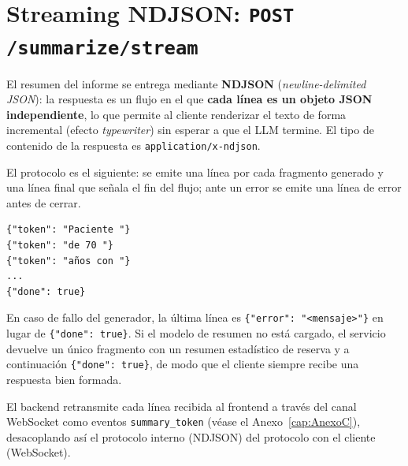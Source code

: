 \section{Streaming NDJSON: \texttt{POST /summarize/stream}}

El resumen del informe se entrega mediante \textbf{NDJSON} (\emph{newline-delimited JSON}): la respuesta es un flujo en el que \textbf{cada línea es un objeto JSON independiente}, lo que permite al cliente renderizar el texto de forma incremental (efecto \emph{typewriter}) sin esperar a que el LLM termine. El tipo de contenido de la respuesta es \texttt{application/x-ndjson}.

El protocolo es el siguiente: se emite una línea por cada fragmento generado y una línea final que señala el fin del flujo; ante un error se emite una línea de error antes de cerrar.

{\small
\begin{verbatim}
{"token": "Paciente "}
{"token": "de 70 "}
{"token": "años con "}
...
{"done": true}
\end{verbatim}
}

En caso de fallo del generador, la última línea es \texttt{\{"error": "<mensaje>"\}} en lugar de \texttt{\{"done": true\}}. Si el modelo de resumen no está cargado, el servicio devuelve un único fragmento con un resumen estadístico de reserva y a continuación \texttt{\{"done": true\}}, de modo que el cliente siempre recibe una respuesta bien formada.

El backend retransmite cada línea recibida al frontend a través del canal WebSocket como eventos \texttt{summary\_token} (véase el Anexo~\ref{cap:AnexoC}), desacoplando así el protocolo interno (NDJSON) del protocolo con el cliente (WebSocket).
